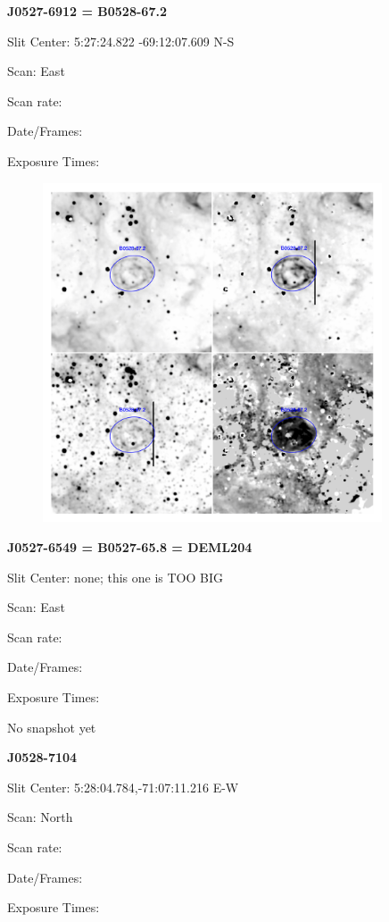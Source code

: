 \documentclass[11pt]{article}
\begin{document}
\newpage
{\bf J0527-6912 = B0528-67.2}  
 
Slit Center:   5:27:24.822  -69:12:07.609 N-S

Scan:  East

Scan rate:  

Date/Frames:

Exposure Times:  

\begin{figure}
\includegraphics[width=10.05cm]{snapshots/B0528-672.png}
\end{figure}

\newpage
{\bf J0527-6549 = B0527-65.8 = DEML204}  
 
Slit Center:   none; this one is TOO BIG

Scan:  East

Scan rate:  

Date/Frames:

Exposure Times:  

No snapshot yet
\begin{figure}
\end{figure}

\newpage
{\bf J0528-7104}  
 
Slit Center:   5:28:04.784,-71:07:11.216  E-W

Scan:  North

Scan rate:  

Date/Frames:

Exposure Times:  
\end{document}
